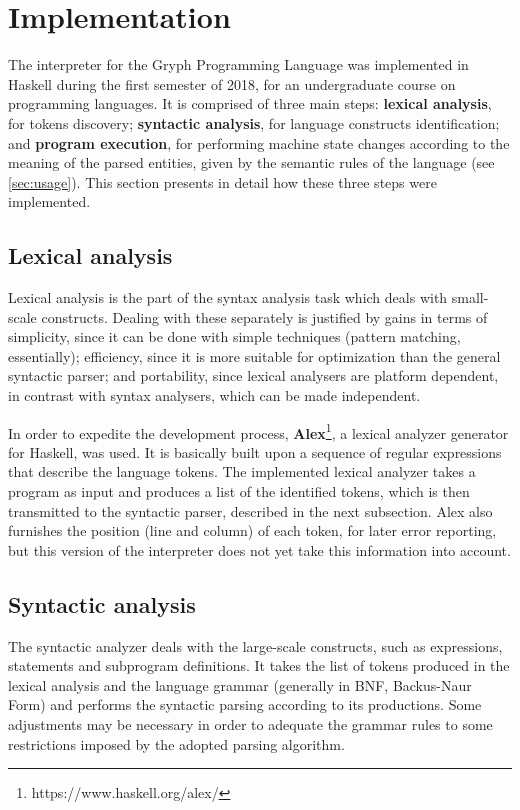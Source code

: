 \section{Implementation}
\label{sec:implement}

The interpreter for the Gryph Programming Language was implemented in Haskell during the first semester of 2018, for an undergraduate course on programming languages. It is comprised of three
main steps: \textbf{lexical analysis}, for tokens discovery;
\textbf{syntactic analysis}, for language constructs
identification; and \textbf{program execution}, for
performing machine state changes according to the
meaning of the parsed entities, given by the semantic
rules of the language (see \autoref{sec:usage}). This section presents in detail how these three steps were implemented.

\subsection{Lexical analysis}

Lexical analysis is the part of the syntax analysis task
which deals with small-scale constructs. Dealing with these
separately is justified by gains in terms of simplicity, since
it can be done with simple techniques (pattern matching, essentially); efficiency, since it is
more suitable for optimization than the general syntactic parser; 
and portability, since lexical analysers are platform dependent, in contrast
with syntax analysers, which can be made independent.

In order to expedite the development process, \textbf{Alex}\footnote{https://www.haskell.org/alex/}, a lexical analyzer generator for Haskell, was used. It is basically built
upon a sequence of regular expressions that describe the 
language tokens. The implemented lexical analyzer takes a program as input and produces
a list of the identified tokens, which is then transmitted to the
syntactic parser, described in the next subsection. Alex also furnishes
the position (line and column) of each token, for later error reporting, but
this version of the interpreter does not yet take this information into account.

\subsection{Syntactic analysis}

The syntactic analyzer deals with the large-scale constructs, 
such as expressions, statements and subprogram definitions.
It takes the list of tokens produced in the lexical
analysis and the language grammar (generally in BNF, Backus-Naur Form) and performs
the syntactic parsing according to its productions.
Some adjustments may be necessary in order
to adequate the grammar rules to some restrictions imposed by
the adopted parsing algorithm.


